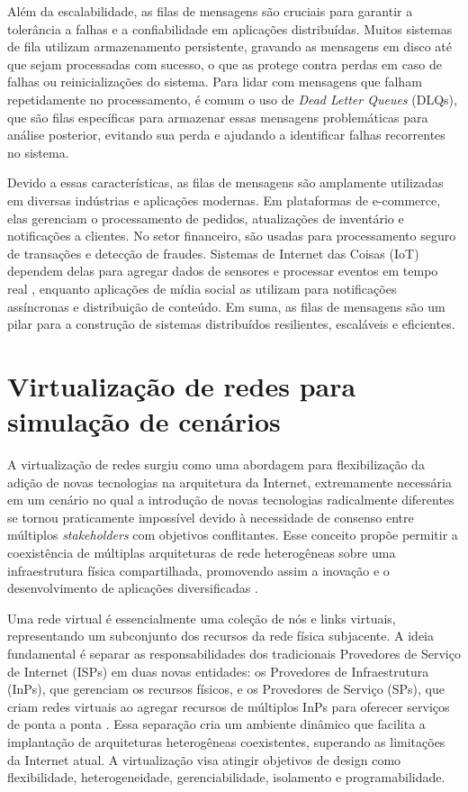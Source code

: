 Além da escalabilidade, as filas de mensagens são cruciais para garantir a tolerância a falhas e a confiabilidade em aplicações distribuídas. Muitos sistemas de fila utilizam armazenamento persistente, gravando as mensagens em disco até que sejam processadas com sucesso, o que as protege contra perdas em caso de falhas ou reinicializações do sistema. Para lidar com mensagens que falham repetidamente no processamento, é comum o uso de \textit{Dead Letter Queues} (DLQs), que são filas específicas para armazenar essas mensagens problemáticas para análise posterior, evitando sua perda e ajudando a identificar falhas recorrentes no sistema.

Devido a essas características, as filas de mensagens são amplamente utilizadas em diversas indústrias e aplicações modernas. Em plataformas de e-commerce, elas gerenciam o processamento de pedidos, atualizações de inventário e notificações a clientes. No setor financeiro, são usadas para processamento seguro de transações e detecção de fraudes. Sistemas de Internet das Coisas (IoT) dependem delas para agregar dados de sensores e processar eventos em tempo real , enquanto aplicações de mídia social as utilizam para notificações assíncronas e distribuição de conteúdo. Em suma, as filas de mensagens são um pilar para a construção de sistemas distribuídos resilientes, escaláveis e eficientes.
 
\section{Virtualização de redes para simulação de cenários}

A virtualização de redes surgiu como uma abordagem para flexibilização da adição de novas tecnologias na arquitetura da Internet, extremamente necessária em um cenário no qual a introdução de novas tecnologias radicalmente diferentes se tornou praticamente impossível devido à necessidade de consenso entre múltiplos \textit{stakeholders} com objetivos conflitantes. Esse conceito propõe permitir a coexistência de múltiplas arquiteturas de rede heterogêneas sobre uma infraestrutura física compartilhada, promovendo assim a inovação e o desenvolvimento de aplicações diversificadas \cite{aSurveyOfNetworkVirtualization2010}.

Uma rede virtual é essencialmente uma coleção de nós e links virtuais, representando um subconjunto dos recursos da rede física subjacente. A ideia fundamental é separar as responsabilidades dos tradicionais Provedores de Serviço de Internet (ISPs) em duas novas entidades: os Provedores de Infraestrutura (InPs), que gerenciam os recursos físicos, e os Provedores de Serviço (SPs), que criam redes virtuais ao agregar recursos de múltiplos InPs para oferecer serviços de ponta a ponta \cite{aSurveyOfNetworkVirtualization2010}. Essa separação cria um ambiente dinâmico que facilita a implantação de arquiteturas heterogêneas coexistentes, superando as limitações da Internet atual. A virtualização visa atingir objetivos de design como flexibilidade, heterogeneidade, gerenciabilidade, isolamento e programabilidade.

